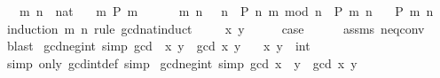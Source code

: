 \begin{isabellebody}
\ \ \ m\ n\ {\isacharcolon}{\kern0pt}{\isacharcolon}{\kern0pt}\ nat\isanewline
\ \ \ {\isachardoublequoteopen}{\isasymAnd}m{\isachardot}{\kern0pt}\ P\ m\ {}{\isachardoublequoteclose}\isanewline
\ \ \ \ \ {\isachardoublequoteopen}{\isasymAnd}m\ n{\isachardot}{\kern0pt}\ {}\ {\isacharless}{\kern0pt}\ n\ {\isasymLongrightarrow}\ P\ n\ {\isacharparenleft}{\kern0pt}m\ mod\ n{\isacharparenright}{\kern0pt}\ {\isasymLongrightarrow}\ P\ m\ n{\isachardoublequoteclose}\isanewline
\ \ \ {\isachardoublequoteopen}P\ m\ n{\isachardoublequoteclose}\isanewline
%
\isadelimproof
%
\endisadelimproof
%
\isatagproof
{}\isamarkupfalse%
\ {\isacharparenleft}{\kern0pt}induction\ m\ n\ rule{\isacharcolon}{\kern0pt}\ gcd{\isacharunderscore}{\kern0pt}nat{\isachardot}{\kern0pt}induct{\isacharparenright}{\kern0pt}\isanewline
\ \ \isamarkupfalse%
\ {\isacharparenleft}{\kern0pt}{}\ x\ y{\isacharparenright}{\kern0pt}\isanewline
\ \ \isamarkupfalse%
\ \isamarkupfalse%
\ {\isacharquery}{\kern0pt}case\isanewline
\ \ \ \ \isamarkupfalse%
\ assms\ neq{}{\isacharunderscore}{\kern0pt}conv\ \isamarkupfalse%
\ blast\isanewline
{}\isamarkupfalse%
%
\endisatagproof
{\isafoldproof}%
%
\isadelimproof
\isanewline
%
\endisadelimproof
\isanewline
{}\isamarkupfalse%
\ gcd{\isacharunderscore}{\kern0pt}neg{}{\isacharunderscore}{\kern0pt}int\ {\isacharbrackleft}{\kern0pt}simp{\isacharbrackright}{\kern0pt}{\isacharcolon}{\kern0pt}\ {\isachardoublequoteopen}gcd\ {\isacharparenleft}{\kern0pt}{\isacharminus}{\kern0pt}\ x{\isacharparenright}{\kern0pt}\ y\ {\isacharequal}{\kern0pt}\ gcd\ x\ y{\isachardoublequoteclose}\isanewline
\ \ \ x\ y\ {\isacharcolon}{\kern0pt}{\isacharcolon}{\kern0pt}\ int\isanewline
%
\isadelimproof
\ \ %
\endisadelimproof
%
\isatagproof
{}\isamarkupfalse%
\ {\isacharparenleft}{\kern0pt}simp\ only{\isacharcolon}{\kern0pt}\ gcd{\isacharunderscore}{\kern0pt}int{\isacharunderscore}{\kern0pt}def{\isacharparenright}{\kern0pt}\ simp%
\endisatagproof
{\isafoldproof}%
%
\isadelimproof
\isanewline
%
\endisadelimproof
\isanewline
{}\isamarkupfalse%
\ gcd{\isacharunderscore}{\kern0pt}neg{}{\isacharunderscore}{\kern0pt}int\ {\isacharbrackleft}{\kern0pt}simp{\isacharbrackright}{\kern0pt}{\isacharcolon}{\kern0pt}\ {\isachardoublequoteopen}gcd\ x\ {\isacharparenleft}{\kern0pt}{\isacharminus}{\kern0pt}\ y{\isacharparenright}{\kern0pt}\ {\isacharequal}{\kern0pt}\ gcd\ x\ y{\isachardoublequoteclose}\isanewline

\end{isabellebody}
